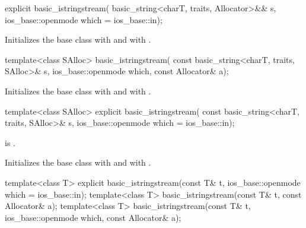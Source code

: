 %
\begin{itemdecl}
explicit basic_istringstream(
  basic_string<charT, traits, Allocator>&& s,
  ios_base::openmode which = ios_base::in);
\end{itemdecl}

\begin{itemdescr}
\pnum
\effects
Initializes the base class with
and  with
.
\end{itemdescr}

%
\begin{itemdecl}
template<class SAlloc>
  basic_istringstream(
    const basic_string<charT, traits, SAlloc>& s,
    ios_base::openmode which, const Allocator& a);
\end{itemdecl}

\begin{itemdescr}
\pnum
\effects
Initializes the base class with
and  with
\linebreak{}. %
\end{itemdescr}

%
\begin{itemdecl}
template<class SAlloc>
  explicit basic_istringstream(
    const basic_string<charT, traits, SAlloc>& s,
    ios_base::openmode which = ios_base::in);
\end{itemdecl}

\begin{itemdescr}
\pnum
\constraints
{} is .

\pnum
\effects
Initializes the base class with
and  with
.
\end{itemdescr}

%
\begin{itemdecl}
template<class T>
  explicit basic_istringstream(const T& t, ios_base::openmode which = ios_base::in);
template<class T>
  basic_istringstream(const T& t, const Allocator& a);
template<class T>
  basic_istringstream(const T& t, ios_base::openmode which, const Allocator& a);
\end{itemdecl}

